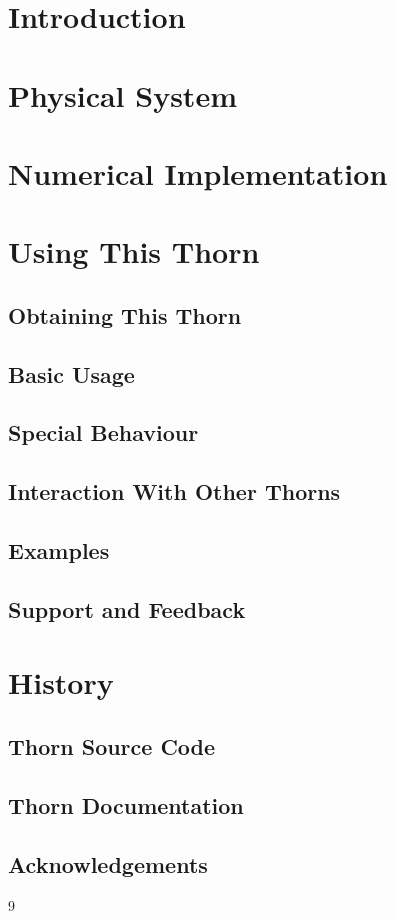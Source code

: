 \section{Introduction}

\section{Physical System}

\section{Numerical Implementation}

\section{Using This Thorn}

\subsection{Obtaining This Thorn}

\subsection{Basic Usage}

\subsection{Special Behaviour}

\subsection{Interaction With Other Thorns}

\subsection{Examples}

\subsection{Support and Feedback}

\section{History}

\subsection{Thorn Source Code}

\subsection{Thorn Documentation}

\subsection{Acknowledgements}


\begin{thebibliography}{9}

\end{thebibliography}



